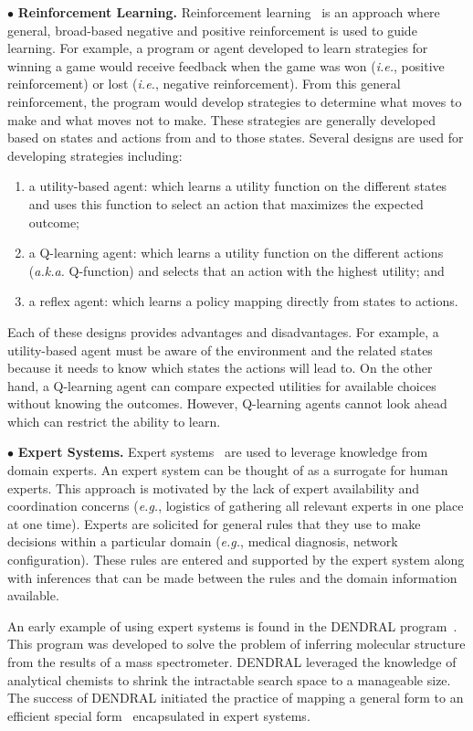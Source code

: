 \documentclass[conference]{IEEEtran}
\begin{document}
$\bullet$ {\bf Reinforcement Learning.}  Reinforcement learning~\cite{Kober:13}\cite{Russell:10}
is an approach where general, broad-based negative and positive reinforcement is used to guide learning. For example, a program or agent developed to learn strategies for winning a game would receive feedback when the game was won (\emph{i.e.}, positive reinforcement) or lost (\emph{i.e.}, negative reinforcement). From this general reinforcement, the program would develop strategies to determine what moves to make and what moves not to make.
These strategies are generally developed based on states and actions from and to those states. Several designs are used for developing strategies including:
\begin{enumerate}
\item a utility-based agent: which learns a utility function on the different states and uses this function to select an action that maximizes the expected outcome;
\item a Q-learning agent: which learns a utility function on the different actions (\emph{a.k.a.} Q-function) and selects that an action with the highest utility; and
\item a reflex agent: which learns a policy mapping directly from states to actions.
\end{enumerate}

Each of these designs provides advantages and disadvantages. For example, a utility-based agent must be aware of the environment and the related states because it needs to know which states the actions will lead to. On the other hand, a Q-learning agent can compare expected utilities for available choices without knowing the outcomes. However, Q-learning agents cannot look ahead which can restrict the ability to learn.

$\bullet$ {\bf Expert Systems.}  Expert systems~\cite{Russell:10} are used to leverage
knowledge from domain experts. An expert system can be thought of as a surrogate for
human experts. This approach is motivated by the lack of expert availability and coordination concerns (\emph{e.g.}, logistics of gathering all relevant experts in one place at one time). Experts are solicited for general
rules that they use to make decisions within a particular domain (\emph{e.g.}, medical diagnosis, network configuration). These rules are entered and supported by the expert system along with inferences that can be made between the rules and the domain information available.

An early example of using expert systems is found in the DENDRAL program~\cite{Buchanan:69}. This program was developed to solve the problem of inferring molecular structure from the results of a mass spectrometer. DENDRAL leveraged the knowledge of analytical chemists to shrink the intractable search space to a manageable size. The success of DENDRAL initiated the practice of mapping a general form to an efficient special form~\cite{Feigenbaum:71} encapsulated in expert systems.
\end{document}
